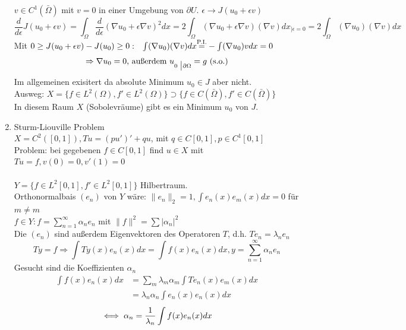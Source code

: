 \begin{enumerate}
	$v \in C^{1}(\bar \Omega)$ mit $v = 0$ in einer Umgebung von $\partial U$. $\epsilon \rightarrow J(u_{0} + \epsilon v)$
	\[ \frac{d}{d\epsilon} J(u_{0} + \epsilon v) = \int_{\Omega} \frac{d}{d\epsilon} (\nabla u_{0} + \epsilon \nabla v)^{2} dx = 2 \int_{\Omega} (\nabla u_{0} + \epsilon \nabla v)(\nabla v) dx_{\big| \epsilon = 0} = 2 \int_\Omega (\nabla u_{0}) (\nabla v) dx \]
	Mit $0 \geq J(u_{0} + \epsilon v)- J(u_{0}) \geq 0: \hspace{0.25cm} \int (\nabla u_{0})(\nabla v) dx \overset{\text{P.I.}}{{=}} - \int (\nabla u_{0})v dx = 0$ \\
	\[ \Rightarrow \nabla u_{0} = 0 \text{, au{\ss}erdem } u_{0 \hspace{0.1cm} \big| \partial \Omega} = g \text{ (s.o.)} \]
	Im allgemeinen exisitert da absolute Minimum $u_{0} \in J$ aber nicht. \\
	Ausweg: $X = \{ f \in L^{2}(\Omega), f' \in L^{2}(\Omega) \} \supset \{f \in C(\bar \Omega), f' \in C(\bar \Omega) \} $	\\
	In diesem Raum $X$ (Sobolevräume) gibt es ein Minimum $u_{0}$ von $J$. \\
	\item Sturm-Liouville Problem \\
	$X = C^{2}([0, 1]), Tu = (pu')' + qu$, mit $q \in C[0, 1], p \in C^{1}[0, 1]$ \\ 
	Problem: bei gegebenen $f \in C[0, 1]$ find $u \in X$ mit $Tu = f, v(0) = 0, v'(1) = 0$ \\ \\
	$Y = \{ f \in L^{2}[0, 1], f' \in L^{2}[0, 1] \}$ Hilbertraum. \\
	Orthonormalbais $(e_{n})$ von $Y$ wäre: $\| e_{n} \|_{2} = 1, \int e_{n}(x) e_{m}(x) dx = 0$ für $m \neq m$ \\
	$f \in Y: f = \sum_{n = 1}^{\infty} \alpha_{n} e_{n}$ mit $\| f \|^2 = \sum | \alpha_{n} |^2$ \\
	Die $(e_{n})$ sind au{\ss}erdem Eigenvektoren des Operatoren $T$, d.h. $Te_{n} = \lambda_{n} e_{n}$ \\
	\[ Ty = f \Rightarrow \int Ty(x) e_{n}(x) dx = \int f(x) e_{n}(x) dx, y = \sum_{n = 1}^{\infty} \alpha_{n} e_{n} \]
	Gesucht sind die Koeffizienten $\alpha_{n}$
	\begin{align*}
		\int f(x) e_{n}(x) dx & = \sum_{m} \lambda_{m} \alpha_{m} \int T e_{n}(x) e_{m}(x) dx \\
							  & =  \lambda_{n} \alpha_{n} \int e_{n}(x) e_{n}(x) dx
	\end{align*}
	\[ \iff \alpha_{n} = \frac{1}{\lambda_n} \int f(x) e_{n}(x) dx \]
\end{enumerate}


